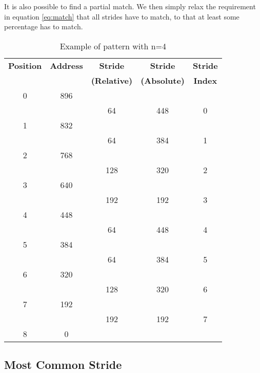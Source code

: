 It is also possible to find a partial match. We then simply relax the
requirement in equation \eqref{eq:match} that all strides have to match, to
that at least some percentage has to match.

\begin{table}
	\caption{Example of pattern with n=4}
	\label{table:pattern}
	\centering
	\begin{tabular}{c|c|c|c|c}
		\bfseries Position &
		\bfseries Address &
		\bfseries Stride &
		\bfseries Stride &
		\bfseries Stride \\
		& &
		\bfseries (Relative) &
		\bfseries (Absolute) &
		\bfseries Index \\
		\hline
		0 & 896   & & \\
		  &	& 64 & 448 & 0 \\
		1 & 832  & & \\
		  & & 64 & 384 & 1 \\
		2 & 768 & & \\
		  & & 128 & 320 & 2 \\
		3 & 640 & & \\
		  & & 192 & 192 & 3 \\
		4 & 448 & & \\
		  &	& 64 & 448 & 4 \\
		5 & 384 & & \\
		  &	& 64 & 384 & 5 \\
		6 & 320 & & \\
		  &	& 128 & 320 & 6 \\
		7 & 192 & & \\
		  &	& 192 & 192 & 7 \\
		8 & 0 & & \\
	\end{tabular}
\end{table}

\subsection{Most Common Stride}

